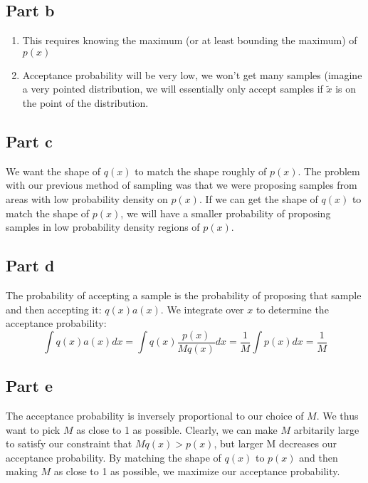 \documentclass{article}
\begin{document}
\subsection{Part b}
\begin{enumerate}
    \item This requires knowing the maximum (or at least bounding the maximum) of $p(x)$
    \item Acceptance probability will be very low, we won't get many samples (imagine a very pointed distribution, we will essentially only accept samples if $\tilde{x}$ is on the point of the distribution.
\end{enumerate}
\subsection{Part c}
We want the shape of $q(x)$ to match the shape roughly of $p(x)$. The problem with our previous method of sampling was that we were proposing samples from areas with low probability density on $p(x)$. If we can get the shape of $q(x)$ to match the shape of $p(x)$, we will have a smaller probability of proposing samples in low probability density regions of $p(x)$.
\subsection{Part d}
The probability of accepting a sample is the probability of proposing that sample and then accepting it: $q(x)a(x)$. We integrate over $x$ to determine the acceptance probability:
$$\int q(x)a(x)dx = \int q(x)\frac{p(x)}{Mq(x)}dx = \frac{1}{M}\int p(x)dx = \frac{1}{M}$$
\subsection{Part e}
The acceptance probability is inversely proportional to our choice of $M$. We thus want to pick $M$ as close to 1 as possible. Clearly, we can make $M$ arbitarily large to satisfy our constraint that $Mq(x)>p(x)$, but larger M decreases our acceptance probability. By matching the shape of $q(x)$ to $p(x)$ and then making $M$ as close to 1 as possible, we maximize our acceptance probability.
\end{document}
